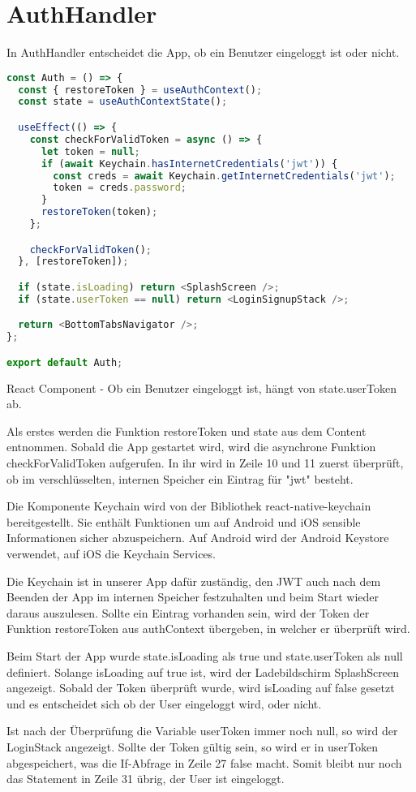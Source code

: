 \section{AuthHandler}
In AuthHandler entscheidet die App, ob ein Benutzer eingeloggt ist oder nicht.

\begin{code}[htp]
\begin{lstlisting}[firstnumber=1,language=JavaScript, style=JSX]
const Auth = () => {
  const { restoreToken } = useAuthContext();
  const state = useAuthContextState();

  useEffect(() => {
    const checkForValidToken = async () => {
      let token = null;
      if (await Keychain.hasInternetCredentials('jwt')) {
        const creds = await Keychain.getInternetCredentials('jwt');
        token = creds.password;
      }
      restoreToken(token);
    };

    checkForValidToken();
  }, [restoreToken]);

  if (state.isLoading) return <SplashScreen />;
  if (state.userToken == null) return <LoginSignupStack />;

  return <BottomTabsNavigator />;
};

export default Auth;
\end{lstlisting}
\caption{React Component - Ob ein Benutzer eingeloggt ist, hängt von state.userToken ab.}
\end{code}

Als erstes werden die Funktion restoreToken und state aus dem Content entnommen. Sobald die App
gestartet wird, wird die asynchrone Funktion checkForValidToken aufgerufen. In ihr wird in Zeile 10
und 11 zuerst überprüft, ob im verschlüsselten, internen Speicher ein Eintrag für "jwt" besteht.

Die Komponente Keychain wird von der Bibliothek react-native-keychain bereitgestellt. Sie enthält
Funktionen um auf Android und iOS sensible Informationen sicher abzuspeichern. Auf Android wird der
Android Keystore verwendet, auf iOS die Keychain Services.

Die Keychain ist in unserer App dafür zuständig, den JWT auch nach dem Beenden der App im internen
Speicher festzuhalten und beim Start wieder daraus auszulesen. Sollte ein Eintrag vorhanden sein,
wird der Token der Funktion restoreToken aus authContext übergeben, in welcher er überprüft wird.

Beim Start der App wurde state.isLoading als true und state.userToken als null definiert. Solange
isLoading auf true ist, wird der Ladebildschirm SplashScreen angezeigt. Sobald der Token überprüft
wurde, wird isLoading auf false gesetzt und es entscheidet sich ob der User eingeloggt wird, oder
nicht.

Ist nach der Überprüfung die Variable userToken immer noch null, so wird der LoginStack angezeigt.
Sollte der Token gültig sein, so wird er in userToken abgespeichert, was die If-Abfrage in Zeile 27
false macht. Somit bleibt nur noch das Statement in Zeile 31 übrig, der User ist eingeloggt.
